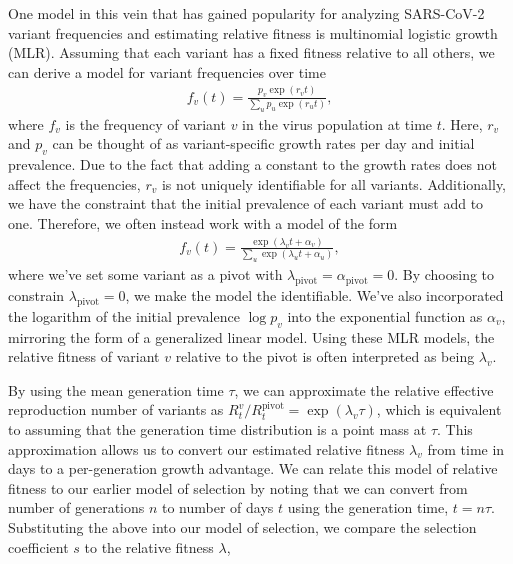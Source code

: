 
One model in this vein that has gained popularity for analyzing SARS-CoV-2 variant frequencies and estimating relative fitness is multinomial logistic growth (MLR).
Assuming that each variant has a fixed fitness relative to all others, we can derive a model for variant frequencies over time
\begin{align}
f_{v}(t) = \frac{p_{v}\exp(r_{v}t)}{\sum_{u} p_{u} \exp(r_{u}t)},
\end{align}
where $f_{v}$ is the frequency of variant $v$ in the virus population at time $t$.
Here, $r_{v}$ and $p_{v}$ can be thought of as variant-specific growth rates per day and initial prevalence.
Due to the fact that adding a constant to the growth rates does not affect the frequencies, $r_{v}$ is not uniquely identifiable for all variants.
Additionally, we have the constraint that the initial prevalence of each variant must add to one.
Therefore, we often instead work with a model of the form
\begin{align}
f_{v}(t) = \frac{\exp(\lambda_{v} t + \alpha_{v})}{\sum_{u} \exp(\lambda_{u} t + \alpha_{u})},
\end{align}
where we've set some variant as a pivot with $\lambda_{\text{pivot}} = \alpha_{\text{pivot}}=0$.
By choosing to constrain $\lambda_{\text{pivot}}=0$, we make the model the identifiable.
We've also incorporated the logarithm of the initial prevalence $\log p_v$ into the exponential function as $\alpha_v$, mirroring the form of a generalized linear model.
Using these MLR models, the relative fitness of variant $v$ relative to the pivot is often interpreted as being $\lambda_{v}$.

By using the mean generation time $\tau$, we can approximate the relative effective reproduction number of variants as $R_{t}^{v} / R_{t}^{\text{pivot}} = \exp(\lambda_{v}\tau)$, which is equivalent to assuming that the generation time distribution is a point mass at $\tau$.
This approximation allows us to convert our estimated relative fitness $\lambda_v$ from time in days to a per-generation growth advantage.
We can relate this model of relative fitness to our earlier model of selection by noting that we can convert from number of generations $n$ to number of days $t$ using the generation time, $t = n\tau$.
Substituting the above into our model of selection, we compare the selection coefficient $s$ to the relative fitness $\lambda$,

